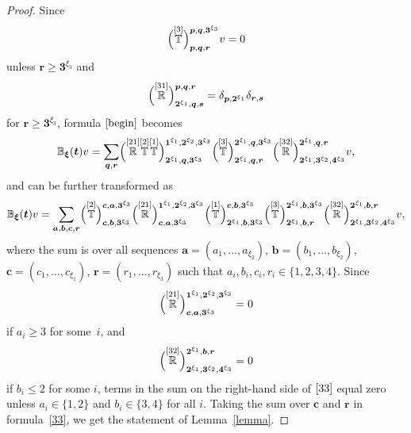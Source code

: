 \documentclass[pdftex]{sigma}
\numberwithin{equation}{section}
\begin{document}
\begin{proof}
Since
\[
\Bigl( \overset{[3]}{\mathbb{T}} \Big)^{\boldsymbol{p},\boldsymbol{q},\boldsymbol{3}^{\xi_3}}_{\boldsymbol{p},\boldsymbol{q},\boldsymbol{r}} v=0
\]
 unless $\boldsymbol{r}\geq \boldsymbol{3}^{\xi_3}$ and
\[
\Bigl(\overset{[31]}{\mathbb{R}} \Big)^{\boldsymbol{p},\boldsymbol{q},\boldsymbol{r}}_{\boldsymbol{2}^{\xi_1}, \boldsymbol{q},\boldsymbol{s}}=\delta_{\boldsymbol{p},\boldsymbol{2}^{\xi_1}} \delta_{\boldsymbol{{r}},\boldsymbol{{s}}}
\]
for $\boldsymbol{r}\geq \boldsymbol{3}^{\xi_3}$, formula $\eqref{begin}$ becomes
\begin{equation*}
{\mathbb{B}}_{\boldsymbol{\xi}}(\boldsymbol{t})v=\sum_{\boldsymbol{q},\boldsymbol{r}}
\Bigl( \overset{[21]}{\mathbb{R}} \overset{[2]}{\mathbb{T}} \overset{[1]}{\mathbb{T}} \Big)^{\boldsymbol{1}^{\xi_1},\boldsymbol{2}^{\xi_2}, \boldsymbol{3}^{\xi_3}}_{\boldsymbol{2}^{\xi_1},\boldsymbol{q},\boldsymbol{3}^{\xi_3}}
\Bigl( \overset{[3]}{\mathbb{T}} \Big)^{\boldsymbol{2}^{\xi_1},\boldsymbol{q},\boldsymbol{3}^{\xi_3}}_{\boldsymbol{2}^{\xi_1},\boldsymbol{q},\boldsymbol{r}} \Bigl( \overset{[32]}{\mathbb{R}} \Big)^{\boldsymbol{2}^{\xi_1},\boldsymbol{q},\boldsymbol{r}}_{\boldsymbol{2}^{\xi_1},\boldsymbol{3}^{\xi_2},\boldsymbol{4}^{\xi_3}}v,
\end{equation*}
and can be further transformed as
\begin{equation}\label{33}
{\mathbb{B}}_{\boldsymbol{\xi}}(\boldsymbol{t})v= \sum_{\boldsymbol{a},\boldsymbol{b},\boldsymbol{c},\boldsymbol{r}}
\Bigl(\overset{[2]}{\mathbb{T}} \Big)^{\boldsymbol{c},\boldsymbol{a},\boldsymbol{3}^{\xi_3}}_{\boldsymbol{c},\boldsymbol{b},\boldsymbol{3}^{\xi_3}}
\Bigl(\overset{[21]}{\mathbb{R}} \Big)^{\boldsymbol{1}^{\xi_1},\boldsymbol{2}^{\xi_2},\boldsymbol{3}^{\xi_3}}_{\boldsymbol{c},\boldsymbol{a},\boldsymbol{3}^{\xi_3}}
\Bigl(\overset{[1]}{\mathbb{T}} \Big)^{\boldsymbol{c},\boldsymbol{b},\boldsymbol{3}^{\xi_3}}_{\boldsymbol{2}^{\xi_1},\boldsymbol{b},\boldsymbol{3}^{\xi_3}} \Bigl( \overset{[3]}{\mathbb{T}} \Big)^{\boldsymbol{2}^{\xi_1},\boldsymbol{b},\boldsymbol{3}^{\xi_3}}_{\boldsymbol{2}^{\xi_1},\boldsymbol{b},\boldsymbol{r}} \Bigl( \overset{[32]}{\mathbb{R}} \Big)^{\boldsymbol{2}^{\xi_1},\boldsymbol{b},\boldsymbol{r}}_{\boldsymbol{2}^{\xi_1},\boldsymbol{3}^{\xi_2},\boldsymbol{4}^{\xi_3}}v,
\end{equation}
where the sum is over all sequences $\boldsymbol{a}=(a_1,\dots,a_{\xi_2})$, $\boldsymbol{b}=(b_1,\dots,b_{\xi_2})$, $\boldsymbol{c}=(c_1,\dots, c_{\xi_1})$, $\boldsymbol{r}=(r_1,\dots,r_{\xi_3})$ such that $a_i,b_i,c_i,r_i\in\{1,2,3,4\}$. Since
\[
\Bigl(\overset{[21]}{\mathbb{R}} \Bigr)^{\boldsymbol{1}^{\xi_1},\boldsymbol{2}^{\xi_2},\boldsymbol{3}^{\xi_3}}_{\boldsymbol{c},\boldsymbol{a},\boldsymbol{3}^{\xi_3}}=0
\]
 if $a_i\geq3$ for some~$i$, and
 \[
 \Bigl( \overset{[32]}{\mathbb{R}} \Bigr)^{\boldsymbol{2}^{\xi_1},\boldsymbol{b},\boldsymbol{r}}_{\boldsymbol{2}^{\xi_1},\boldsymbol{3}^{\xi_2},\boldsymbol{4}^{\xi_3}}=0
 \]
 if $b_i\leq 2$ for some $i$, terms in the sum on the right-hand side of $\eqref{33}$ equal zero unless $a_i\in\{1,2\}$ and $b_i\in \{3,4\}$ for all $i$. Taking the sum over $\boldsymbol{c}$ and $\boldsymbol{r}$ in formula~\eqref{33}, we get the statement of Lemma~\ref{lemma}.
\end{proof}
\end{document}
